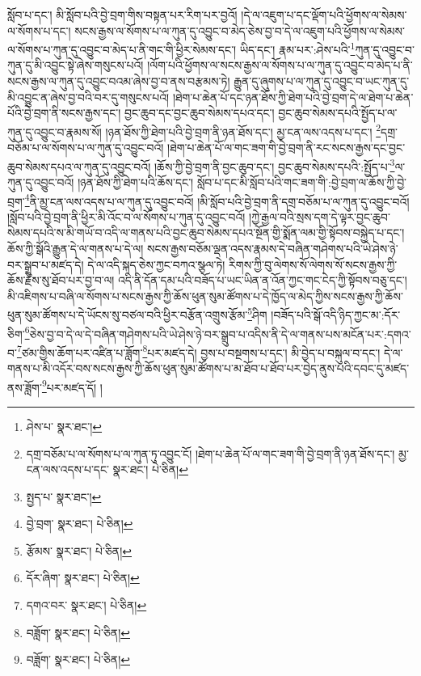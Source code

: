 སློབ་པ་དང་། མི་སློབ་པའི་བྱེ་བྲག་གིས་བསྟན་པར་རིག་པར་བྱའོ། །དེ་ལ་འཇུག་པ་དང་ལྡོག་པའི་ཕྱོགས་ལ་སེམས་ལ་སོགས་པ་དང་། སངས་རྒྱས་ལ་སོགས་པ་ལ་ཀུན་དུ་འབྱུང་བ་མེད་ཅེས་བྱ་བ་དེ་ལ་འཇུག་པའི་ཕྱོགས་ལ་སེམས་ལ་སོགས་པ་ཀུན་དུ་འབྱུང་བ་མེད་པ་ནི་གང་གི་ཕྱིར་སེམས་དང་། ཡིད་དང་། རྣམ་པར་:ཤེས་པའི་\footnote{ཤེས་པ་  སྣར་ཐང་། }ཀུན་དུ་འབྱུང་བ་ཀུན་དུ་མི་འབྱུང་སྟེ་ཞེས་གསུངས་པའོ། །ལོག་པའི་ཕྱོགས་ལ་སངས་རྒྱས་ལ་སོགས་པ་ལ་ཀུན་དུ་འབྱུང་བ་མེད་པ་ནི་སངས་རྒྱས་ལ་ཀུན་དུ་འབྱུང་བའམ་ཞེས་བྱ་བ་ནས་བརྩམས་ཏེ། རྒྱུན་དུ་ཞུགས་པ་ལ་ཀུན་དུ་འབྱུང་བ་ཡང་ཀུན་དུ་མི་འབྱུང་ན་ཞེས་བྱ་བའི་བར་དུ་གསུངས་པའོ། །ཐེག་པ་ཆེན་པོ་དང་ཉན་ཐོས་ཀྱི་ཐེག་པའི་བྱེ་བྲག་དེ་ལ་ཐེག་པ་ཆེན་པོའི་བྱེ་བྲག་ནི་སངས་རྒྱས་དང་། བྱང་ཆུབ་དང་བྱང་ཆུབ་སེམས་དཔའ་དང་། བྱང་ཆུབ་སེམས་དཔའི་སྤྱོད་པ་ལ་ཀུན་དུ་འབྱུང་བ་རྣམས་སོ། །ཉན་ཐོས་ཀྱི་ཐེག་པའི་བྱེ་བྲག་ནི་ཉན་ཐོས་དང་། མྱ་ངན་ལས་འདས་པ་དང་། \footnote{དགྲ་བཅོམ་པ་ལ་སོགས་པ་ལ་ཀུན་ཏུ་འབྱུང་ངོ། །ཐེག་པ་ཆེན་པོ་ལ་གང་ཟག་གི་བྱེ་བྲག་ནི་ཉན་ཐོས་དང་། མྱ་ངན་ལས་འདས་པ་དང་  སྣར་ཐང་།  པེ་ཅིན། }དགྲ་བཅོམ་པ་ལ་སོགས་པ་ལ་ཀུན་དུ་འབྱུང་བའོ། །ཐེག་པ་ཆེན་པོ་ལ་གང་ཟག་གི་བྱེ་བྲག་ནི་རང་སངས་རྒྱས་དང་བྱང་ཆུབ་སེམས་དཔའ་ལ་ཀུན་དུ་འབྱུང་བའོ། །ཆོས་ཀྱི་བྱེ་བྲག་ནི་བྱང་ཆུབ་དང་། བྱང་ཆུབ་སེམས་དཔའི་:སྤྱོད་པ་\footnote{སྤྱད་པ་  སྣར་ཐང་། }ལ་ཀུན་དུ་འབྱུང་བའོ། །ཉན་ཐོས་ཀྱི་ཐེག་པའི་ཆོས་དང་། སློབ་པ་དང་མི་སློབ་པའི་གང་ཟག་གི་:བྱེ་བྲག་ལ་ཆོས་ཀྱི་བྱེ་བྲག་\footnote{བྱེ་བྲག་  སྣར་ཐང་།  པེ་ཅིན། }ནི་མྱ་ངན་ལས་འདས་པ་ལ་ཀུན་དུ་འབྱུང་བའོ། །མི་སློབ་པའི་བྱེ་བྲག་ནི་དགྲ་བཅོམ་པ་ལ་ཀུན་དུ་འབྱུང་བའོ། །སློབ་པའི་བྱེ་བྲག་ནི་ཕྱིར་མི་འོང་བ་ལ་སོགས་པ་ཀུན་དུ་འབྱུང་བའོ། །ཀྱེ་རྒྱལ་བའི་སྲས་དག་དེ་ལྟར་བྱང་ཆུབ་སེམས་དཔའི་ས་མི་གཡོ་བ་འདི་ལ་གནས་པའི་བྱང་ཆུབ་སེམས་དཔའ་སྔོན་གྱི་སྨོན་ལམ་གྱི་སྟོབས་བསྐྱེད་པ་དང་། ཆོས་ཀྱི་སྒོའི་རྒྱུན་དེ་ལ་གནས་པ་དེ་ལ། སངས་རྒྱས་བཅོམ་ལྡན་འདས་རྣམས་དེ་བཞིན་གཤེགས་པའི་ཡེ་ཤེས་ཉེ་བར་སྒྲུབ་པ་མཛད་དེ། དེ་ལ་འདི་སྐད་ཅེས་ཀྱང་བཀའ་སྩལ་ཏེ། རིགས་ཀྱི་བུ་ལེགས་སོ་ལེགས་སོ་སངས་རྒྱས་ཀྱི་ཆོས་རྗེས་སུ་ཐོབ་པར་བྱ་བ་ལ། འདི་ནི་དོན་དམ་པའི་བཟོད་པ་ཡང་ཡིན་ན་འོན་ཀྱང་གང་ངེད་ཀྱི་སྟོབས་བཅུ་དང་། མི་འཇིགས་པ་བཞི་ལ་སོགས་པ་སངས་རྒྱས་ཀྱི་ཆོས་ཕུན་སུམ་ཚོགས་པ་དེ་ཁྱོད་ལ་མེད་ཀྱིས་སངས་རྒྱས་ཀྱི་ཆོས་ཕུན་སུམ་ཚོགས་པ་དེ་ཡོངས་སུ་བཙལ་བའི་ཕྱིར་བརྩོན་འགྲུས་རྩོམ་\footnote{རྩོམས་  སྣར་ཐང་།  པེ་ཅིན། }ཤིག །བཟོད་པའི་སྒོ་འདི་ཉིད་ཀྱང་མ་:དོར་ཅིག་\footnote{དོར་ཞིག་  སྣར་ཐང་།  པེ་ཅིན། }ཅེས་བྱ་བ་དེ་ལ་དེ་བཞིན་གཤེགས་པའི་ཡེ་ཤེས་ཉེ་བར་སྒྲུབ་པ་འདིས་ནི་དེ་ལ་གནས་པས་མངོན་པར་:དགའ་བ་\footnote{དགའ་བར་  སྣར་ཐང་།  པེ་ཅིན། }ཙམ་གྱིས་ཆོག་པར་འཛིན་པ་ཟློག་\footnote{བཟློག་  སྣར་ཐང་།  པེ་ཅིན། }པར་མཛད་དེ། བྱས་པ་བསྔགས་པ་དང་། མི་བྱེད་པ་བསྐུལ་བ་དང་། དེ་ལ་གནས་པ་མི་འདོར་བས་སངས་རྒྱས་ཀྱི་ཆོས་ཕུན་སུམ་ཚོགས་པ་མ་ཐོབ་པ་ཐོབ་པར་བྱེད་ནུས་པའི་དབང་དུ་མཛད་ནས་ཟློག་\footnote{བཟློག་  སྣར་ཐང་།  པེ་ཅིན། }པར་མཛད་དོ། །

